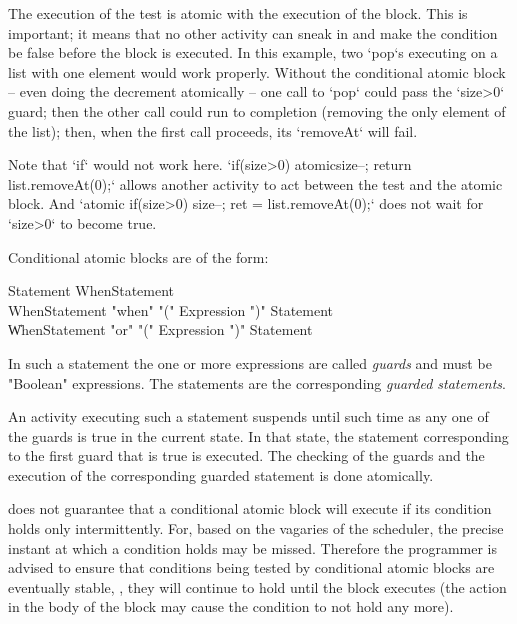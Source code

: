 The execution of the test is atomic with the execution of the block.  This is
important; it means that no other activity can sneak in and make the condition
be false before the block is executed.  In this example, two \xcd`pop`s
executing on a list with one element would work properly. Without the
conditional atomic block -- even doing the decrement atomically -- one call to
\xcd`pop` could pass the \xcd`size>0` guard; then the other call could run to
completion (removing the only element of the list); then, when the first call
proceeds, its \xcd`removeAt` will fail.  

Note that \xcd`if` would not work here.  
\xcd`if(size>0) atomic{size--; return list.removeAt(0);}` allows another
activity to act between the test and the atomic block.  
And 
\xcd`atomic{ if(size>0) {size--; ret = list.removeAt(0);}}` 
does not wait for \xcd`size>0` to become true.


Conditional atomic blocks are of the form:

\begin{grammar}
Statement \:  WhenStatement \\
WhenStatement \:  \xcd"when" \xcd"(" Expression \xcd")" Statement \\
            \| WhenStatement \xcd"or" \xcd"(" Expression \xcd")" Statement 
\end{grammar}

In such a statement the one or more expressions are called {\em
guards} and must be \xcd"Boolean" expressions. The statements are the
corresponding {\em guarded statements}.  

An activity executing such a statement suspends until such time as any
one of the guards is true in the current state. In that state, the
statement corresponding to the first guard that is true is executed.
The checking of the guards and the execution of the corresponding
guarded statement is done atomically. 

\Xten{} does not guarantee that a conditional atomic block
will execute if its condition holds only intermittently. For, based on
the vagaries of the scheduler, the precise instant at which a
condition holds may be missed. Therefore the programmer is advised to
ensure that conditions being tested by conditional atomic blocks are
eventually stable, \ie, they will continue to hold until the block
executes (the action in the body of the block may cause the condition
to not hold any more).


